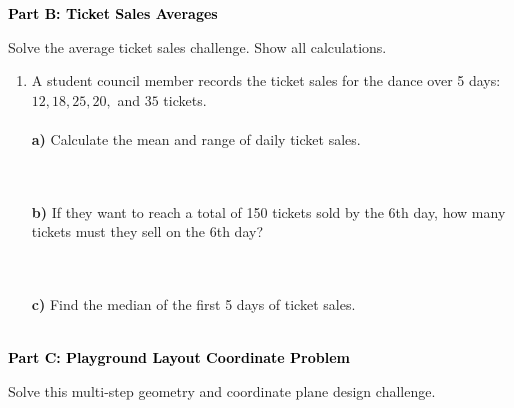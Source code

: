 \documentclass[12pt, letterpaper, fleqn]{article}
\begin{document}
\newpage

\begin{tcolorbox}[colback=black!10]
    \large\textcolor{black}{\textbf{Part B: Ticket Sales Averages}}
\end{tcolorbox}

\vspace{3mm}

\noindent
Solve the average ticket sales challenge. Show all calculations.

\vspace{5mm}

\begin{enumerate}[itemsep=3cm, leftmargin=0.6cm]
\item A student council member records the ticket sales for the dance over 5 days: $12, 18, 25, 20,$ and $35$ tickets. \\ \\
\textbf{a)} Calculate the mean and range of daily ticket sales. \\ \\
 \\
\vspace{3cm}

\textbf{b)} If they want to reach a total of 150 tickets sold by the 6th day, how many tickets must they sell on the 6th day? \\ \\
 \\
\vspace{3cm}

\textbf{c)} Find the median of the first 5 days of ticket sales.  \\ \\

\end{enumerate}

\newpage

\begin{tcolorbox}[colback=black!10]
    \large\textcolor{black}{\textbf{Part C: Playground Layout Coordinate Problem}}
\end{tcolorbox}

\vspace{3mm}

\noindent
Solve this multi-step geometry and coordinate plane design challenge.
\end{document}
